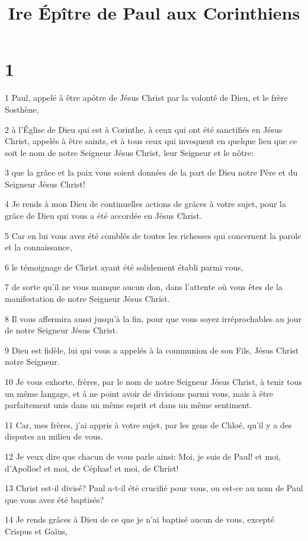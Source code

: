 

\title{Ire Épître de Paul aux Corinthiens}


\chapter{1}

\par 1 Paul, appelé à être apôtre de Jésus Christ par la volonté de Dieu, et le frère Sosthène,
\par 2 à l'Église de Dieu qui est à Corinthe, à ceux qui ont été sanctifiés en Jésus Christ, appelés à être saints, et à tous ceux qui invoquent en quelque lieu que ce soit le nom de notre Seigneur Jésus Christ, leur Seigneur et le nôtre:
\par 3 que la grâce et la paix vous soient données de la part de Dieu notre Père et du Seigneur Jésus Christ!
\par 4 Je rends à mon Dieu de continuelles actions de grâces à votre sujet, pour la grâce de Dieu qui vous a été accordée en Jésus Christ.
\par 5 Car en lui vous avez été comblés de toutes les richesses qui concernent la parole et la connaissance,
\par 6 le témoignage de Christ ayant été solidement établi parmi vous,
\par 7 de sorte qu'il ne vous manque aucun don, dans l'attente où vous êtes de la manifestation de notre Seigneur Jésus Christ.
\par 8 Il vous affermira aussi jusqu'à la fin, pour que vous soyez irréprochables au jour de notre Seigneur Jésus Christ.
\par 9 Dieu est fidèle, lui qui vous a appelés à la communion de son Fils, Jésus Christ notre Seigneur.
\par 10 Je vous exhorte, frères, par le nom de notre Seigneur Jésus Christ, à tenir tous un même langage, et à ne point avoir de divisions parmi vous, mais à être parfaitement unis dans un même esprit et dans un même sentiment.
\par 11 Car, mes frères, j'ai appris à votre sujet, par les gens de Chloé, qu'il y a des disputes au milieu de vous.
\par 12 Je veux dire que chacun de vous parle ainsi: Moi, je suis de Paul! et moi, d'Apollos! et moi, de Céphas! et moi, de Christ!
\par 13 Christ est-il divisé? Paul a-t-il été crucifié pour vous, ou est-ce au nom de Paul que vous avez été baptisés?
\par 14 Je rends grâces à Dieu de ce que je n'ai baptisé aucun de vous, excepté Crispus et Gaïus,
